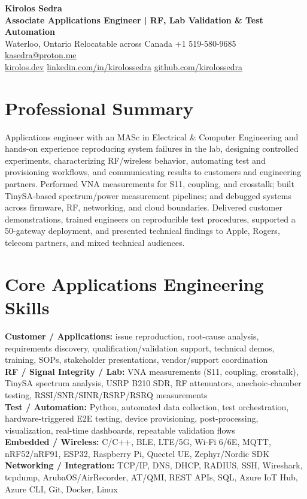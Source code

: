 \documentclass[letterpaper,10pt]{article}
\begin{document}
\begin{center}
{\LARGE \textbf{Kirolos Sedra}} \\
\vspace{2pt}
{\large \textbf{Associate Applications Engineer | RF, Lab Validation \& Test Automation}} \\
\vspace{3pt}
Waterloo, Ontario \textbar{} Relocatable across Canada \textbar{} +1 519-580-9685 \textbar{}
\href{mailto:kasedra@proton.me}{kasedra@proton.me} \\
\href{https://kirolos.dev}{kirolos.dev} \textbar{}
\href{https://linkedin.com/in/kirolossedra}{linkedin.com/in/kirolossedra} \textbar{}
\href{https://github.com/kirolossedra}{github.com/kirolossedra}
\end{center}
\vspace{-6pt}

\section{Professional Summary}
Applications engineer with an MASc in Electrical \& Computer Engineering and hands-on experience reproducing system failures in the lab, designing controlled experiments, characterizing RF/wireless behavior, automating test and provisioning workflows, and communicating results to customers and engineering partners. Performed VNA measurements for S11, coupling, and crosstalk; built TinySA-based spectrum/power measurement pipelines; and debugged systems across firmware, RF, networking, and cloud boundaries. Delivered customer demonstrations, trained engineers on reproducible test procedures, supported a 50-gateway deployment, and presented technical findings to Apple, Rogers, telecom partners, and mixed technical audiences.

\section{Core Applications Engineering Skills}
{\small
\textbf{Customer / Applications:} issue reproduction, root-cause analysis, requirements discovery, qualification/validation support, technical demos, training, SOPs, stakeholder presentations, vendor/support coordination \\
\textbf{RF / Signal Integrity / Lab:} VNA measurements (S11, coupling, crosstalk), TinySA spectrum analysis, USRP B210 SDR, RF attenuators, anechoic-chamber testing, RSSI/SNR/SINR/RSRP/RSRQ measurements \\
\textbf{Test / Automation:} Python, automated data collection, test orchestration, hardware-triggered E2E testing, device provisioning, post-processing, visualization, real-time dashboards, repeatable validation flows \\
\textbf{Embedded / Wireless:} C/C++, BLE, LTE/5G, Wi-Fi 6/6E, MQTT, nRF52/nRF91, ESP32, Raspberry Pi, Quectel UE, Zephyr/Nordic SDK \\
\textbf{Networking / Integration:} TCP/IP, DNS, DHCP, RADIUS, SSH, Wireshark, tcpdump, ArubaOS/AirRecorder, AT/QMI, REST APIs, SQL, Azure IoT Hub, Azure CLI, Git, Docker, Linux
}
\end{document}
